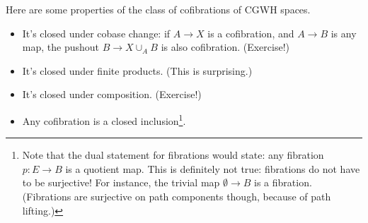 Here are some properties of the class of cofibrations of CGWH spaces.
\begin{itemize}
    \item It's closed under cobase change: if $A\to X$ is a cofibration, and $A\to B$ is any map,
	the pushout $B\to X\cup_A B$ is also cofibration. (Exercise!)
    \item It's closed under finite products. (This is surprising.)
    \item It's closed under composition. (Exercise!)
    \item Any cofibration is a closed inclusion\footnote{Note that the dual statement for
	fibrations would state:	any fibration $p:E\to B$ is a quotient map.
	This is definitely not true: fibrations do not have to be surjective!
	For instance, the trivial map $\emptyset\to B$ is a fibration.
	(Fibrations are surjective on path components though, because of path lifting.)}.
\end{itemize}
